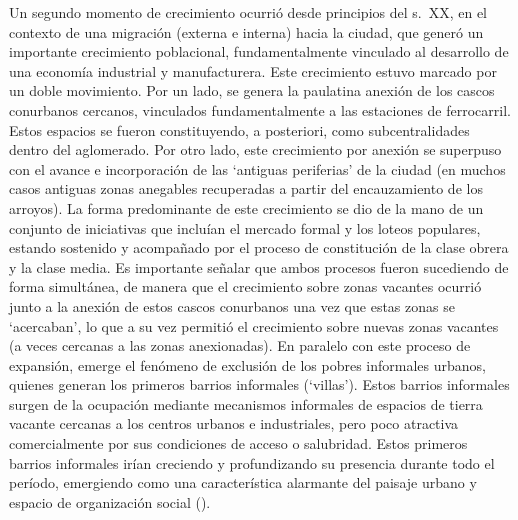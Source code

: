 \documentclass[
  spanish,
  a4paper,%
  chapterprefix=true,%
  DIV=calc,%
  twoside]{scrbook}%
\begin{document}
Un segundo momento de crecimiento ocurrió desde principios del s.~XX, en
el contexto de una migración (externa e interna) hacia la ciudad, que
generó un importante crecimiento poblacional, fundamentalmente vinculado
al desarrollo de una economía industrial y manufacturera. Este
crecimiento estuvo marcado por un doble movimiento. Por un lado, se
genera la paulatina anexión de los cascos conurbanos cercanos,
vinculados fundamentalmente a las estaciones de ferrocarril. Estos
espacios se fueron constituyendo, a posteriori, como subcentralidades
dentro del aglomerado. Por otro lado, este crecimiento por anexión se
superpuso con el avance e incorporación de las `antiguas periferias' de
la ciudad (en muchos casos antiguas zonas anegables recuperadas a partir
del encauzamiento de los arroyos). La forma predominante de este
crecimiento se dio de la mano de un conjunto de iniciativas que incluían
el mercado formal y los loteos populares, estando sostenido y acompañado
por el proceso de constitución de la clase obrera y la clase media. Es
importante señalar que ambos procesos fueron sucediendo de forma
simultánea, de manera que el crecimiento sobre zonas vacantes ocurrió
junto a la anexión de estos cascos conurbanos una vez que estas zonas se
`acercaban', lo que a su vez permitió el crecimiento sobre nuevas zonas
vacantes (a veces cercanas a las zonas anexionadas). En paralelo con
este proceso de expansión, emerge el fenómeno de exclusión de los pobres
informales urbanos, quienes generan los primeros barrios informales
(`villas'). Estos barrios informales surgen de la ocupación mediante
mecanismos informales de espacios de tierra vacante cercanas a los
centros urbanos e industriales, pero poco atractiva comercialmente por
sus condiciones de acceso o salubridad. Estos primeros barrios
informales irían creciendo y profundizando su presencia durante todo el
período, emergiendo como una característica alarmante del paisaje urbano
y espacio de organización social ().
\end{document}
